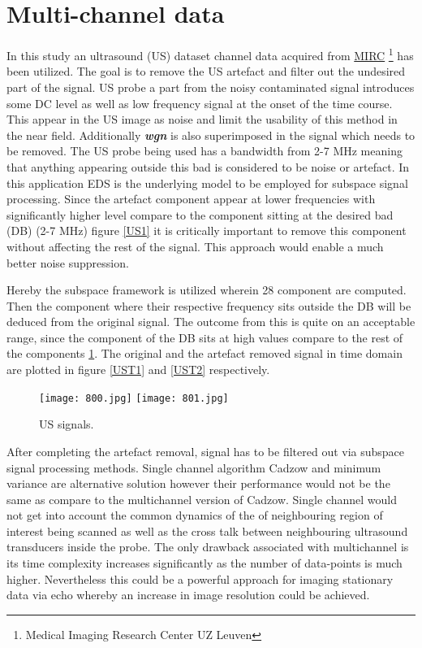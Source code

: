 \section{Multi-channel data}

In this study an ultrasound (US) dataset channel data acquired from \href{www.medicalimagingcenter.be/}{MIRC} \footnote{Medical Imaging Research Center UZ Leuven} has been utilized. The goal is to remove the US artefact and filter out the undesired part of the signal. US probe a part from the noisy contaminated signal introduces some DC level as well as low frequency signal at the onset of the time course. This appear in the US image as noise and limit the usability of this method in the near field. Additionally \textbf{\textit{wgn}} is also superimposed in the signal which needs to be removed. The US probe being used has a bandwidth from 2-7 MHz meaning that anything appearing outside this bad is considered to be noise or artefact. In this application EDS is the underlying model to be employed for subspace signal processing. Since the artefact component appear at lower frequencies with significantly higher level compare to the component sitting at the desired bad (DB) (2-7 MHz) figure \ref{US1} it is critically important to remove this component without affecting the rest of the signal. This approach would enable a much better noise suppression. 

Hereby the subspace framework is utilized wherein 28 component are computed. Then the component where their respective frequency sits outside the DB will be deduced from the original signal. The outcome from this is quite on an acceptable range, since the component of the DB sits at high values compare to the rest of the components \ref{US2}. The original and the artefact removed signal in time domain are plotted in figure \ref{UST1} and \ref{UST2} respectively.


\begin{figure}[!htbp]
%
\centering
\texttt{[image: 800.jpg]}
\label{US1}
\endminipage\hfill
{}%
\centering
\texttt{[image: 801.jpg]}
\label{US2}
\endminipage\hfill
\caption{US signals.}
\end{figure}

After completing the artefact removal, signal has to be filtered out via subspace signal processing methods. Single channel algorithm Cadzow and minimum variance are alternative solution however their performance would not be the same as compare to the multichannel version of Cadzow. Single channel would not get into account the common dynamics of the of neighbouring region of interest being scanned as well as the cross talk between neighbouring ultrasound transducers inside the probe. The only drawback associated with multichannel is its time complexity increases significantly as the number of data-points is much higher. Nevertheless this could be a powerful approach for imaging stationary data via echo whereby an increase in image resolution could be achieved. 
 




